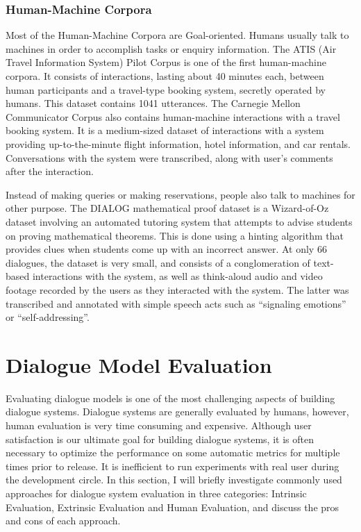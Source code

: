 \documentclass[bsc,frontabs,twoside,singlespacing,parskip,deptreport]{infthesis}     %
\begin{document}
\subsubsection{Human-Machine Corpora}

Most of the Human-Machine Corpora are Goal-oriented. Humans usually talk to machines in order to accomplish tasks or enquiry information. The ATIS (Air Travel Information System) Pilot Corpus\cite{hemphill1990atis} is one of the first human-machine corpora. It consists of interactions, lasting about 40 minutes each, between human participants and a travel-type booking system, secretly operated by humans. This dataset contains 1041 utterances. The Carnegie Mellon Communicator Corpus\cite{bennett2002carnegie} also contains human-machine interactions with a travel booking system. It is a medium-sized dataset of interactions with a system providing up-to-the-minute flight information, hotel information, and car rentals. Conversations 
with the system were transcribed, along with user’s comments after the interaction.

Instead of making queries or making reservations, people also talk to machines for other purpose. The DIALOG mathematical proof dataset\cite{wolska2004annotated} is a Wizard-of-Oz dataset involving an automated tutoring system that attempts to advise students on proving mathematical theorems. This is done using a hinting algorithm that provides clues when students come up with an incorrect answer. At only 66 dialogues, the dataset is very small, and consists of a conglomeration of text-based interactions with the system, as well as think-aloud audio and video footage recorded by the users as they interacted with the system. The latter was transcribed and annotated with simple speech acts such as “signaling emotions” or “self-addressing”.


\section{Dialogue Model Evaluation}

Evaluating dialogue models is one of the most challenging aspects of building dialogue systems. Dialogue systems are generally evaluated by humans, however, human evaluation is very time consuming and expensive. Although user satisfaction is our ultimate goal for building dialogue systems, it is often necessary to optimize the performance on some automatic metrics for multiple times prior to release. It is inefficient to run experiments with real user during the development circle. In this section, I will briefly investigate commonly used approaches for dialogue system evaluation in three categories: Intrinsic Evaluation, Extrinsic Evaluation and Human Evaluation, and discuss the pros and cons of each approach.
\end{document}
